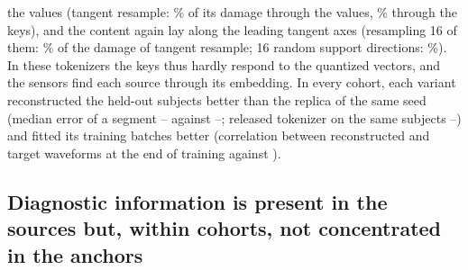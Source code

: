 \documentclass[10pt,letterpaper]{article}
\begin{document}
the values (tangent resample: \VarValuesTangentMedianPct\% of its damage through the values,
\VarKeysTangentMedianPct\% through the keys), and the content again lay along the leading tangent axes
(resampling 16 of them: \VarShareTPCsixteenMedianPct\% of the damage of tangent resample; 16 random
support directions: \VarShareRandsixteenMedianPct\%). In these tokenizers the keys thus hardly respond
to the quantized vectors, and the sensors find each source through its embedding. In every cohort, each
variant reconstructed the held-out subjects better than the replica of the same seed (median error of a segment \VarMSEMin--\VarMSEMax{}
against \RepMSEMin--\RepMSEMax; released tokenizer on the same subjects
\RepReleasedMSEMin--\RepReleasedMSEMax) and fitted its training batches better (correlation between
reconstructed and target waveforms at the end of training \VarPCCRange{} against \RepPCCRange).

\subsection*{Diagnostic information is present in the sources but, within cohorts, not concentrated in the anchors}\label{sec:res-diagnosis}
\end{document}
